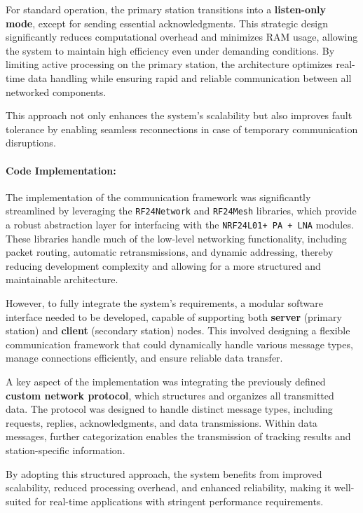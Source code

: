 For standard operation, the primary station transitions into a \textbf{listen-only mode}, except for sending essential acknowledgments. This strategic design significantly reduces computational overhead and minimizes RAM usage, allowing the system to maintain high efficiency even under demanding conditions. By limiting active processing on the primary station, the architecture optimizes real-time data handling while ensuring rapid and reliable communication between all networked components.  

This approach not only enhances the system's scalability but also improves fault tolerance by enabling seamless reconnections in case of temporary communication disruptions.  

\paragraph{Code Implementation:}  
The implementation of the communication framework was significantly streamlined by leveraging the \texttt{RF24Network} and \texttt{RF24Mesh} libraries, which provide a robust abstraction layer for interfacing with the \texttt{NRF24L01+ PA + LNA} modules. These libraries handle much of the low-level networking functionality, including packet routing, automatic retransmissions, and dynamic addressing, thereby reducing development complexity and allowing for a more structured and maintainable architecture.  

However, to fully integrate the system’s requirements, a modular software interface needed to be developed, capable of supporting both \textbf{server} (primary station) and \textbf{client} (secondary station) nodes. This involved designing a flexible communication framework that could dynamically handle various message types, manage connections efficiently, and ensure reliable data transfer.  

A key aspect of the implementation was integrating the previously defined \textbf{custom network protocol}, which structures and organizes all transmitted data. The protocol was designed to handle distinct message types, including requests, replies, acknowledgments, and data transmissions. Within data messages, further categorization enables the transmission of tracking results and station-specific information.  

By adopting this structured approach, the system benefits from improved scalability, reduced processing overhead, and enhanced reliability, making it well-suited for real-time applications with stringent performance requirements.  

